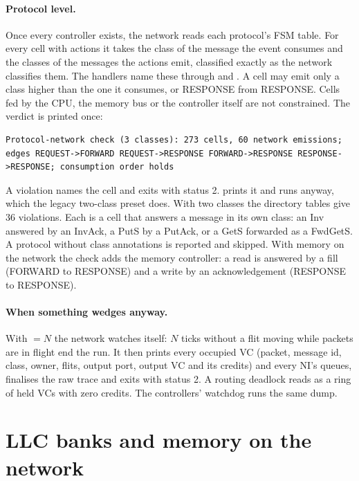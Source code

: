\paragraph{Protocol level.} Once every controller exists, the network reads each protocol's FSM
table. For every cell with actions it takes the class of the message the event consumes and the
classes of the messages the actions emit, classified exactly as the network classifies them. The
handlers name these through  and . A cell may
emit only a class higher than the one it consumes, or RESPONSE from RESPONSE. Cells fed by the CPU,
the memory bus or the controller itself are not constrained. The verdict is printed once:

\begin{lstlisting}[style=plain]
Protocol-network check (3 classes): 273 cells, 60 network emissions; edges REQUEST->FORWARD REQUEST->RESPONSE FORWARD->RESPONSE RESPONSE->RESPONSE; consumption order holds
\end{lstlisting}

A violation names the cell and exits with status 2.  prints it and
runs anyway, which the legacy two-class preset does. With two classes the directory tables give 36
violations. Each is a cell that answers a message in its own class: an Inv answered by an InvAck,
a PutS by a PutAck, or a GetS forwarded as a FwdGetS. A protocol without class
annotations is reported and skipped. With memory on the network the check adds the memory
controller: a read is answered by a fill (FORWARD to RESPONSE) and a write by an acknowledgement
(RESPONSE to RESPONSE).

\paragraph{When something wedges anyway.} With $=N$ the network watches
itself: $N$ ticks without a flit moving while packets are in flight end the run. It then prints
every occupied VC (packet, message id, class, owner, flits, output port, output VC and its credits)
and every NI's queues, finalises the raw trace and exits with status 2. A routing deadlock reads as
a ring of held VCs with zero credits. The controllers' watchdog runs the same dump.

\section{LLC banks and memory on the network}\label{sec:noc-banking}

